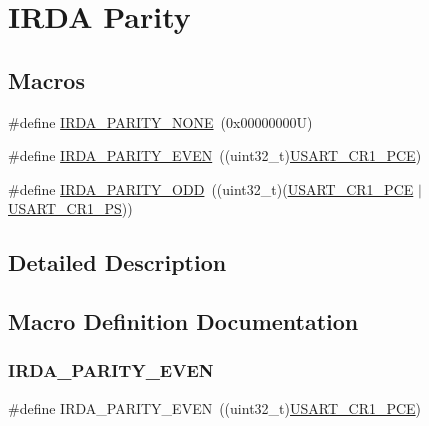 \hypertarget{group___i_r_d_a___parity}{}\section{I\+R\+DA Parity}
\label{group___i_r_d_a___parity}
\subsection*{Macros}
\begin{DoxyCompactItemize}
\item 
\#define \hyperlink{group___i_r_d_a___parity_ga930d90dc494068f6e8fd34c2008af6c3}{I\+R\+D\+A\+\_\+\+P\+A\+R\+I\+T\+Y\+\_\+\+N\+O\+NE}~(0x00000000\+U)
\item 
\#define \hyperlink{group___i_r_d_a___parity_ga1fa76c44ce474adc0d277d849217cc95}{I\+R\+D\+A\+\_\+\+P\+A\+R\+I\+T\+Y\+\_\+\+E\+V\+EN}~((uint32\+\_\+t)\hyperlink{group___peripheral___registers___bits___definition_ga60f8fcf084f9a8514efafb617c70b074}{U\+S\+A\+R\+T\+\_\+\+C\+R1\+\_\+\+P\+CE})
\item 
\#define \hyperlink{group___i_r_d_a___parity_ga64282fa5873f188bb26429bbc88bf040}{I\+R\+D\+A\+\_\+\+P\+A\+R\+I\+T\+Y\+\_\+\+O\+DD}~((uint32\+\_\+t)(\hyperlink{group___peripheral___registers___bits___definition_ga60f8fcf084f9a8514efafb617c70b074}{U\+S\+A\+R\+T\+\_\+\+C\+R1\+\_\+\+P\+CE} $\vert$ \hyperlink{group___peripheral___registers___bits___definition_ga2e159d36ab2c93a2c1942df60e9eebbe}{U\+S\+A\+R\+T\+\_\+\+C\+R1\+\_\+\+PS}))
\end{DoxyCompactItemize}


\subsection{Detailed Description}


\subsection{Macro Definition Documentation}
\mbox{\label{group___i_r_d_a___parity_ga1fa76c44ce474adc0d277d849217cc95}} 
\subsubsection{\texorpdfstring{I\+R\+D\+A\+\_\+\+P\+A\+R\+I\+T\+Y\+\_\+\+E\+V\+EN}{IRDA\_PARITY\_EVEN}}
{\footnotesize\ttfamily \#define I\+R\+D\+A\+\_\+\+P\+A\+R\+I\+T\+Y\+\_\+\+E\+V\+EN~((uint32\+\_\+t)\hyperlink{group___peripheral___registers___bits___definition_ga60f8fcf084f9a8514efafb617c70b074}{U\+S\+A\+R\+T\+\_\+\+C\+R1\+\_\+\+P\+CE})}


